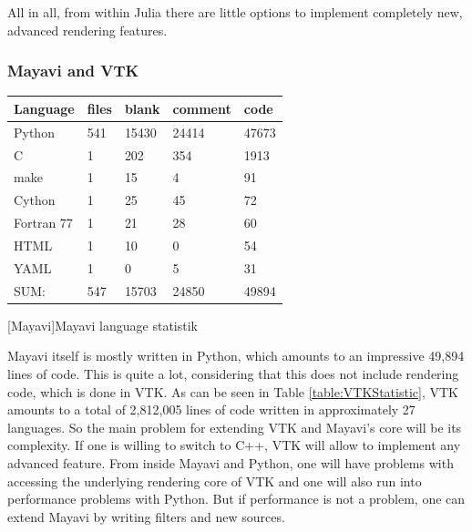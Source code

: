 {All in all, from within Julia there are little options to implement completely new, advanced rendering features.

\subsubsection{Mayavi and VTK}
\begin{table}[htbp]
    \centering
    \begin{tabular}{l|l|l|l|l}
        \hline
        \textbf{Language} &    \textbf{files} &    \textbf{blank} &  \textbf{comment} &  \textbf{code}\\
        \hline
        Python          &               541      &    15430     &    24414   &       47673\\
        C               &                 1      &     202      &      354   &      1913\\
        make            &                 1      &       15     &         4  &        91\\
        Cython          &                 1      &       25     &        45  &        72\\
        Fortran 77      &                 1      &       21     &        28  &        60\\
        HTML            &                 1      &       10     &         0  &        54\\
        YAML            &                 1      &        0     &        5   &       31\\
        \hline
        SUM:            &               547       &   15703     &     24850  &       49894\\
        \hline
        \end{tabular}
    [Mayavi]{Mayavi language statistik}
    \label{table:mayavistatistic}
\end{table}

Mayavi itself is mostly written in Python, which amounts to an impressive 49,894 lines of code. This is quite a lot, considering that this does not include rendering code, which is done in VTK.
As can be seen in Table \ref{table:VTKStatistic}, VTK amounts to a total of 2,812,005 lines of code written in approximately 27 languages. 
So the main problem for extending VTK and Mayavi's core will be its complexity. If one is willing to switch to C++, VTK will allow to implement any advanced feature. From inside Mayavi and Python, one will have problems with accessing the underlying rendering core of VTK and one will also run into performance problems with Python.
But if performance is not a problem, one can extend Mayavi by writing filters and new sources\cite{MayaviExtension}.


}
